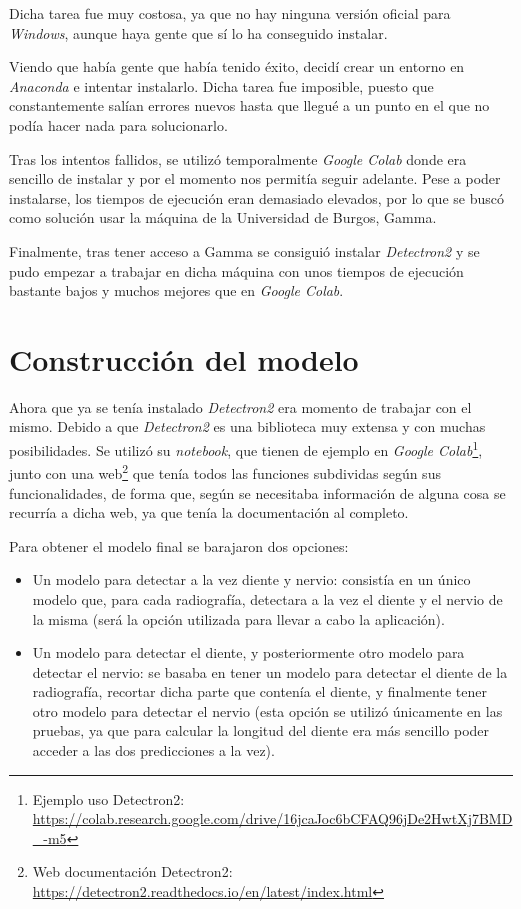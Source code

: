 Dicha tarea fue muy costosa, ya que no hay ninguna versión oficial para \emph{Windows}, aunque haya gente que sí lo ha conseguido instalar. 

Viendo que había gente que había tenido éxito, decidí crear un entorno en \emph{Anaconda} e intentar instalarlo. Dicha tarea fue imposible, puesto que constantemente salían errores nuevos hasta que llegué a un punto en el que no podía hacer nada para solucionarlo.

Tras los intentos fallidos, se utilizó temporalmente \emph{Google Colab} donde era sencillo de instalar y por el momento nos permitía seguir adelante. Pese a poder instalarse, los tiempos de ejecución eran demasiado elevados, por lo que se buscó como solución usar la máquina de la Universidad de Burgos, Gamma.

Finalmente, tras tener acceso a Gamma se consiguió instalar \emph{Detectron2} y se pudo empezar a trabajar en dicha máquina con unos tiempos de ejecución bastante bajos y muchos mejores que en \emph{Google Colab}.

\section{Construcción del modelo}
Ahora que ya se tenía instalado \emph{Detectron2} era momento de trabajar con el mismo. Debido a que \emph{Detectron2} es una biblioteca muy extensa y con muchas posibilidades. Se utilizó su \emph{notebook}, que tienen de ejemplo en \emph{Google Colab}\footnote{Ejemplo uso Detectron2: \url{https://colab.research.google.com/drive/16jcaJoc6bCFAQ96jDe2HwtXj7BMD_-m5}}, junto con una web\footnote{Web documentación Detectron2: \url{https://detectron2.readthedocs.io/en/latest/index.html}} que tenía todos las funciones  subdividas según sus funcionalidades, de forma que, según se necesitaba información de alguna cosa se recurría a dicha web, ya que tenía la documentación al completo.

Para obtener el modelo final se barajaron dos opciones:
\begin{itemize}
    \item Un modelo para detectar a la vez diente y nervio: consistía en un único modelo que, para cada radiografía, detectara a la vez el diente y el nervio de la misma (será la opción utilizada para llevar a cabo la aplicación).
    \item Un modelo para detectar el diente, y posteriormente otro modelo para detectar el nervio: se basaba en tener un modelo para detectar el diente de la radiografía, recortar dicha parte que contenía el diente, y finalmente tener otro modelo para detectar el nervio (esta opción se utilizó únicamente en las pruebas, ya que para calcular la longitud del diente era más sencillo poder acceder a las dos predicciones a la vez).
\end{itemize}

